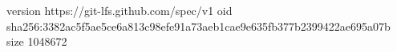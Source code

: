 version https://git-lfs.github.com/spec/v1
oid sha256:3382ac5f5ae5ce6a813c98efe91a73aeb1cae9e635fb377b2399422ae695a07b
size 1048672
